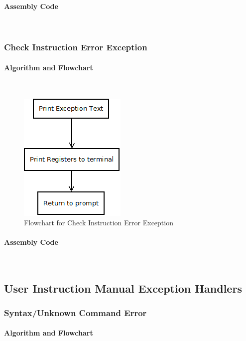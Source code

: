 \documentclass[12pt]{article}
\begin{document}
			\paragraph{Assembly Code}~\\		
			
			\subsubsection{Check Instruction Error Exception}
			\paragraph{Algorithm and Flowchart}~\\
			
			\begin{figure}[H]
				\centering
				\includegraphics[width=0.3\linewidth]{Exception}
				\caption{Flowchart for Check Instruction Error Exception}
				\label{fig:chk}
			\end{figure}
			\paragraph{Assembly Code}~\\			
			
			\subsection{User Instruction Manual Exception Handlers}
			
			\subsubsection{Syntax/Unknown Command Error}
			\paragraph{Algorithm and Flowchart}~\\
			
\end{document}
